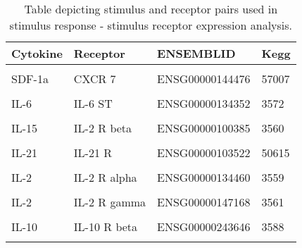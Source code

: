 \documentclass[11pt, a4paper, twosided]{book}
\begin{document}
\begin{table}

\caption{\label{tab:receptorPairs}Table depicting stimulus and receptor pairs used in stimulus response - stimulus receptor expression analysis.}
\centering
\fontsize{7}{9}\selectfont
\begin{tabular}[t]{l|l|l|l}
\hline
Cytokine & Receptor & ENSEMBLID & Kegg\\
\hline
\cellcolor[HTML]{E2E868}{SDF-1a} & \cellcolor[HTML]{E2E868}{CXCR 4} & \cellcolor[HTML]{E2E868}{ENSG00000121966} & \cellcolor[HTML]{E2E868}{7852}\\
\hline
SDF-1a & CXCR 7 & ENSG00000144476 & 57007\\
\hline
\cellcolor[HTML]{E2E868}{IL-6} & \cellcolor[HTML]{E2E868}{IL-6 R} & \cellcolor[HTML]{E2E868}{ENSG00000160712} & \cellcolor[HTML]{E2E868}{3570}\\
\hline
IL-6 & IL-6 ST & ENSG00000134352 & 3572\\
\hline
\cellcolor[HTML]{E2E868}{IL-15} & \cellcolor[HTML]{E2E868}{IL-15 R alpha} & \cellcolor[HTML]{E2E868}{ENSG00000134470} & \cellcolor[HTML]{E2E868}{3601}\\
\hline
IL-15 & IL-2 R beta & ENSG00000100385 & 3560\\
\hline
\cellcolor[HTML]{E2E868}{IL-15} & \cellcolor[HTML]{E2E868}{IL-2 R gamma} & \cellcolor[HTML]{E2E868}{ENSG00000147168} & \cellcolor[HTML]{E2E868}{3561}\\
\hline
IL-21 & IL-21 R & ENSG00000103522 & 50615\\
\hline
\cellcolor[HTML]{E2E868}{IL-21} & \cellcolor[HTML]{E2E868}{IL-21 R gamma} & \cellcolor[HTML]{E2E868}{ENSG00000147168} & \cellcolor[HTML]{E2E868}{3561}\\
\hline
IL-2 & IL-2 R alpha & ENSG00000134460 & 3559\\
\hline
\cellcolor[HTML]{E2E868}{IL-2} & \cellcolor[HTML]{E2E868}{IL-2 R beta} & \cellcolor[HTML]{E2E868}{ENSG00000100385} & \cellcolor[HTML]{E2E868}{3560}\\
\hline
IL-2 & IL-2 R gamma & ENSG00000147168 & 3561\\
\hline
\cellcolor[HTML]{E2E868}{IL-10} & \cellcolor[HTML]{E2E868}{IL-10 R alpha} & \cellcolor[HTML]{E2E868}{ENSG00000110324} & \cellcolor[HTML]{E2E868}{3587}\\
\hline
IL-10 & IL-10 R beta & ENSG00000243646 & 3588\\
\hline
\cellcolor[HTML]{E2E868}{IL-4} & \cellcolor[HTML]{E2E868}{IL-4 R} & \cellcolor[HTML]{E2E868}{ENSG00000077238} & \cellcolor[HTML]{E2E868}{3566}\\

\end{tabular}
\end{table}
\end{document}
